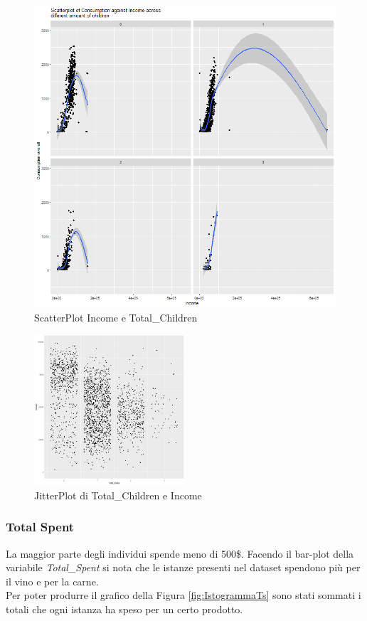 \documentclass[letterpaper,11pt]{article}
\begin{document}
\begin{figure}[h!]
\begin{minipage}[c]{0.4\linewidth}
\includegraphics[width=\linewidth]{Img/EDA/EDA014.png}
\caption{ScatterPlot Income e Total\_Children}
\label{fig:ScatterPlotTcIncome}
\end{minipage}%
\end{figure}


\begin{figure}[h!]
    \centering
    \includegraphics[width=0.5\textwidth]{Img/EDA/EDA015.png}
    \caption{JitterPlot di Total\_Children e Income}
    \label{fig:JitterPlotTcIncome}
\end{figure}

\newpage
\subsubsection{Total Spent}
La maggior parte degli individui spende meno di 500\$.
Facendo il bar-plot della variabile \textit{Total\_Spent} si nota che le istanze presenti nel dataset spendono più per il vino e per la carne.\\
Per poter produrre il grafico della Figura \ref{fig:IstogrammaTs} sono stati sommati i totali che ogni istanza ha speso per un certo prodotto.
\end{document}
